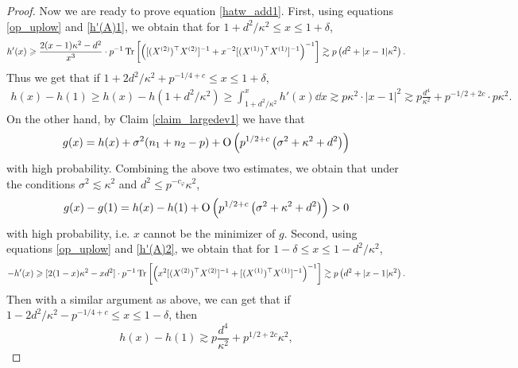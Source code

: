 \begin{proof}



Now we are ready to prove equation \eqref{hatw_add1}. First, using equations \eqref{op_uplow} and  \eqref{h'(A)1}, we obtain that for $1+d^2/\kappa^2 \le x\le 1+\delta$,
$$h'(x)\geqslant \frac{2(x-1)\kappa^2 - d^2}{x^3} \cdot p^{-1} \operatorname{Tr}\left[\left([(X^{(2)})^\top X^{(2)}]^{-1} + x^{-2} [(X^{(1)})^\top X^{(1)}]^{-1}\right)^{-1}\right] \gtrsim p\left(d^2 + |x-1|\kappa^2\right).$$
Thus we get that if $1+2d^2/\kappa^2 +p^{-1/4+c}\le x\le 1+\delta$,
\begin{align*}
h(x)-h(1)\ge h(x)-h(1+d^2/\kappa^2) \ge \int_{1+d^2/\kappa^2}^x h'(x)\dd x \gtrsim p\kappa^2 \cdot |x-1|^2  \gtrsim p\frac{d^4}{\kappa^2} + p^{-1/2+2c}\cdot p\kappa^2 .
\end{align*}
On the other hand, by Claim \ref{claim_largedev1} we have that
$$ g(x)=h(x)+\sigma^2 (n_1+n_2-p)+\operatorname{O} \left(p^{1/2+c}\left(\sigma^2 +\kappa^2+d^2 \right)\right)$$
with high probability. Combining the above two estimates, we obtain that under the conditions $\sigma^2 \lesssim  \kappa^2$ and $d^2 \le p^{-c_{\varphi}}{\kappa^2}$,
$$g(x)-g(1) = h(x)-h(1) + \operatorname{O} \left(p^{1/2+c}\left(\sigma^2 +\kappa^2+d^2 \right)\right) >0$$
with high probability, i.e. $x$ cannot be the minimizer of $g$.
Second, using equations \eqref{op_uplow} and  \eqref{h'(A)2}, we obtain that for $1-\delta \le x \le 1-d^2/\kappa^2$,
$$- h'(x)\geqslant  [2(1-x)\kappa^2 - xd^2] \cdot p^{-1} \operatorname{Tr}\left[\left(x^2[(X^{(2)})^\top X^{(2)}]^{-1} + [(X^{(1)})^\top X^{(1)}]^{-1}\right)^{-1}\right]  \gtrsim p\left(d^2 + |x-1|\kappa^2\right).$$
Then with a similar argument as above, we can get that if $1-2d^2/\kappa^2 - p^{-1/4+c}\le x\le 1-\delta$, then
$$ h(x)-h(1) \gtrsim p\frac{d^4}{\kappa^2} +p^{1/2+2c} \kappa^2, $$

\end{proof}
